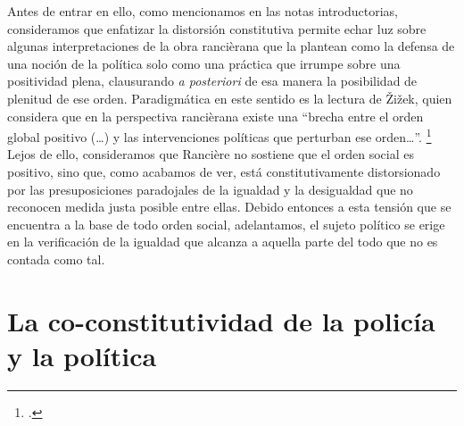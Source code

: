Antes de entrar en ello, como mencionamos en las notas introductorias, consideramos que enfatizar la distorsión constitutiva permite echar luz sobre algunas interpretaciones de la obra rancièrana que la plantean como la defensa de una noción de la política solo como una práctica que irrumpe sobre una positividad plena, clausurando \emph{a posteriori} de esa manera la posibilidad de plenitud de ese orden. Paradigmática en este sentido es la lectura de Žižek, quien considera que en la perspectiva rancièrana existe una \enquote{brecha entre el orden global positivo (\ldots)  y las intervenciones políticas que perturban ese orden\ldots}. \footcite[][185]{@7063-ZIZEK2005} Lejos de ello, consideramos que Rancière no sostiene que el orden social es positivo, sino que, como acabamos de ver, está constitutivamente distorsionado por las presuposiciones paradojales de la igualdad y la desigualdad que no reconocen medida justa posible entre ellas. Debido entonces a esta tensión que se encuentra a la base de todo orden social, adelantamos, el sujeto político se erige en la verificación de la igualdad que alcanza a aquella parte del todo que no es contada como tal.

\section{La co-constitutividad de la policía y la política}


